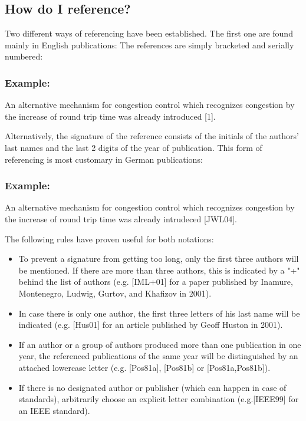 \subsection{How do I reference?}
Two different ways of referencing have been established. The first one are
found mainly in English publications: The references are simply bracketed and
serially numbered:

    \begin{example}
      \subsubsection*{Example:}
      An alternative mechanism for congestion
      control which recognizes congestion by the increase of round
      trip time was already introduced [1].
    \end{example}

Alternatively, the signature of the reference consists of the initials
of the authors' last names and the last 2 digits of the year of publication.
This form of referencing is most customary in German publications:

    \begin{example}
      \subsubsection*{Example:}
      An alternative mechanism for congestion
      control which recognizes congestion by the increase of round
      trip time was already intrudeced [JWL04].
    \end{example}

The following rules have proven useful for both notations:
\begin{itemize}
\item To prevent a signature from getting too long, only the first
  three authors will be mentioned. If there are more than three authors,
  this is indicated by a "+" behind the list of authors
  (e.g. [IML+01] for a paper published by Inamure, Montenegro, Ludwig,
  Gurtov, and Khafizov in 2001).

\item In case there is only one author, the first three letters of his
  last name will be indicated (e.g. [Hus01] for an article published by
  Geoff Huston in 2001).

\item If an author or a group of authors produced more than one publication
  in one year, the referenced publications of the same year will be distinguished by an attached lowercase letter (e.g. [Pos81a], [Pos81b] or [Pos81a,Pos81b]).

\item If there is no designated author or publisher (which can happen in case
  of standards), arbitrarily choose an explicit letter combination (e.g.[IEEE99] for an IEEE standard).
\end{itemize}

